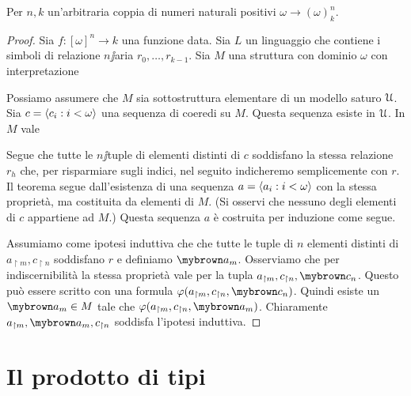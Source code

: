 \begin{theorem}
Per $n,k$ un'arbitraria coppia di numeri naturali positivi $\omega\to(\omega)^n_k$.
\end{theorem}
\begin{proof}
Sia $f:[\omega]^n\to k$ una funzione data. Sia $L$ un linguaggio che contiene i simboli di relazione $n\jj$aria $r_0,\dots,r_{k-1}$. Sia $M$ una struttura con dominio $\omega$ con interpretazione 



Possiamo assumere che $M$ sia sottostruttura elementare di un modello saturo $\EuScript U$. Sia $c=\langle c_i:i<\omega\rangle$ una sequenza di coeredi su $M$. Questa sequenza esiste in $\EuScript U$. In $M$ vale 


Segue che tutte le $n\jj$tuple di elementi distinti di $c$ soddisfano la stessa relazione $r_h$ che, per risparmiare sugli indici, nel seguito indicheremo semplicemente con $r$. Il teorema segue dall'esistenza di una sequenza $a=\langle a_i:i<\omega\rangle$ con la stessa propriet\`a, ma costituita da elementi di $M$. (Si osservi che nessuno degli elementi di $c$ appartiene ad $M$.) Questa sequenza $a$ \`e costruita per induzione come segue. 

Assumiamo come ipotesi induttiva che che tutte le tuple di $n$ elementi distinti di $a_{\restriction m},c_{\restriction n}$ soddisfano $r$ e definiamo ${\mr{a_m}}$. Osserviamo che per indiscernibilit\`a la stessa propriet\`a vale per la tupla $a_{\restriction m},c_{\restriction n},{\mr{c_n}}$. Questo pu\`o essere scritto con una formula $\phi(a_{\restriction m},c_{\restriction n},{\mr{c_n}})$. Quindi esiste un ${\mr{a_m}}\in M$ tale che $\phi(a_{\restriction m},c_{\restriction n},{\mr{a_m}})$. Chiaramente $a_{\restriction m},{\mr{a_m}},c_{\restriction n}$ soddisfa l'ipotesi induttiva.
\end{proof}


\section{Il prodotto di tipi}\label{tipi_prodotto}

